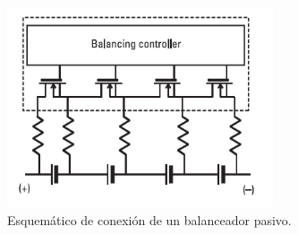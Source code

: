 \documentclass[10pt,a4paper]{article}
\begin{document}
	\begin{figure}[h!]
		\begin{center}
			\includegraphics[width=0.7\textwidth]{passive_equalizator.png}
			\caption{Esquemático de conexión de un balanceador pasivo.}
			\label{passive_equalizator}
		\end{center}
	\end{figure}
	
	
\end{document}
